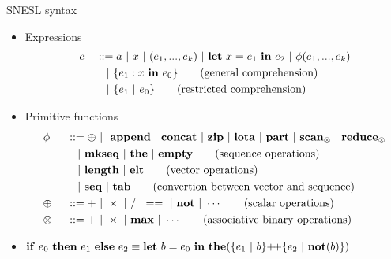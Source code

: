\documentclass{beamer}
\begin{document}
\begin{frame}{SNESL syntax} \small
	\begin{itemize}
		\item<1-> Expressions
		\begin{alignat*}{2}
		& e &&::=  a \ | \ x \ | \ (e_1,...,e_k) \ | \ \Let{x}{e_1}{e_2} \ | \ \hcall{\Tupk{e}} \\ 
		&   && \quad | \ \{e_1:  x \ \*{in} \ e_0 \} \tag{general comprehension} \\
		&   && \quad | \ \{e_1 \ | \ e_0 \}\tag {restricted comprehension} 
		\end{alignat*}	
  \item<2-> Primitive functions
		\begin{alignat*}{2} 
		&\hcall && ::= \oplus \ | \ \ \*{append} \ | \ \*{concat} \ | \ \*{zip} \ | \ \*{iota}  \ | \ \*{part}  \ | \ \*{scan}_{\otimes} \ | \ \*{reduce}_{\otimes}   \\
		&   && \quad | \ \*{mkseq} \ |  \ \*{the}  \ | \ \*{empty} \tag{sequence operations}\\
		&   && \quad | \ \*{length} \ | \ \*{elt}  \tag{vector operations}\\
		&   && \quad | \ \*{seq} \ | \ \*{tab} \tag{convertion between vector and sequence}\\
		& \oplus  \ && :: = +  \ | \ \times \ |  \  / \ | ==  \ | \ \*{not} \ | \ \cdots  \tag{scalar operations}\\
		& \otimes \ && :: = + \ | \ \times  \ | \ \*{max} \ | \ \cdots  \tag{associative binary operations}
		\end{alignat*} 
\item<3-> $\*{if} \ e_0 \ \*{then} \ e_1 \ \*{else} \ e_2 \equiv \Let{b}{e_0}{ \*{the}(\{e_1 \ | \ b \} {\++} \{e_2 \ | \ \*{not}(b)\})} $

	\end{itemize}
\end{frame}
\end{document}
